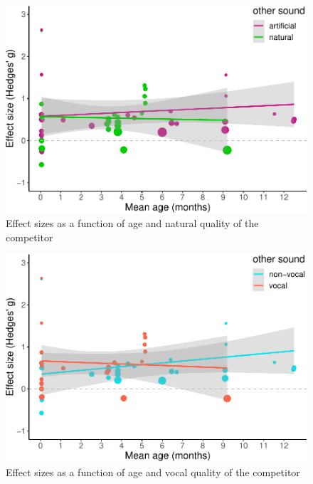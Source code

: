 \documentclass[man]{apa6}
\begin{document}
\begin{figure}
\centering
\includegraphics{MA_speech_pref_files/figure-latex/natural-1.pdf}
\caption{\label{fig:natural}Effect sizes as a function of age and natural
quality of the competitor}
\end{figure}

\begin{figure}
\centering
\includegraphics{MA_speech_pref_files/figure-latex/vocal-1.pdf}
\caption{\label{fig:vocal}Effect sizes as a function of age and vocal
quality of the competitor}
\end{figure}
\end{document}
